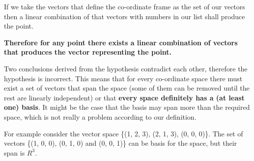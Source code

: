 \documentclass[12pt]{article}
\begin{document}
If we take the vectors that define the co-ordinate frame as the set of our vectors then a linear combination of that vectors with numbers in our list shall produce the point.

\textbf{Therefore for any point there exists a linear combination of vectors that produces the vector representing the point.}

Two conclusions derived from the hypothesis contradict each other, therefore the hypothesis is incorrect. This means that for every co-ordinate space there must exist a set of vectors that span the space (some of them can be removed until the rest are linearly independent) or that \textbf{every space definitely has a (at least one) basis}. It might be the case that the basis may span more than the required space, which is not really a problem according to our definition.

For example consider the vector space \{(1, 2, 3), (2, 1, 3), (0, 0, 0)\}. The set of vectors \{(1, 0, 0), (0, 1, 0) and (0, 0, 1)\} can be basis for the space, but their span is $ R^3 $.
\end{document}
